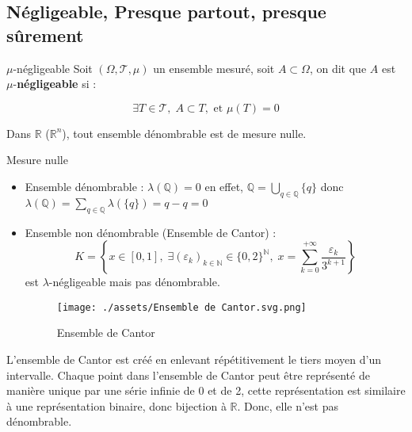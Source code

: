 \subsection{Négligeable, Presque partout, presque sûrement} %


\begin{Definition}[colbacktitle=red!75!black]{$\mu$-négligeable}{}
Soit $(\Omega, \mathcal{T}, \mu)$ un ensemble mesuré, soit $A \subset \Omega$, on dit que $A$ est $\mu$-\textbf{négligeable} si :

\begin{equation}
  \exists T \in \mathcal{T}, \; A \subset T, \text{ et } \mu(T) = 0
\end{equation}
\end{Definition}


\begin{Prop}{}{}
Dans $\mathbb{R}$ ($\mathbb{R} ^{n}$), tout ensemble dénombrable est de mesure nulle. 
\end{Prop}


\begin{Example}{Mesure nulle}{}
\begin{itemize}

    \item Ensemble dénombrable : $\lambda ( \mathbb{Q}) = 0$ en effet, $\mathbb{Q} = \bigcup _{q \in \mathbb{Q}} \{q\}$ donc $\lambda(\mathbb{Q}) = \sum_{q \in \mathbb{Q}}^{}\lambda(\{q\}) = q-q =0$
    \item Ensemble non dénombrable (Ensemble de Cantor) : 
      \begin{equation}
        K = \left\{ x \in [0,1], \; \exists (\varepsilon_k) _{k \in \mathbb{N}} \in \{0, 2 \} ^{\mathbb{N}}, \; x = \sum_{k=0}^{ + \infty} \frac{\varepsilon_k}{3 ^{k+1}} \right\}
      \end{equation}
      est $\lambda$-négligeable mais pas dénombrable.

      \begin{figure}[H] %
        \centering
        \texttt{[image: ./assets/Ensemble de Cantor.svg.png]}
        \caption{Ensemble de Cantor}
        \label{fig:Ensemble de Cantor}
      \end{figure}

      
\end{itemize}
\end{Example}

\begin{myproof}{}{}
L'ensemble de Cantor est créé en enlevant répétitivement le tiers moyen d'un intervalle. Chaque point dans l'ensemble de Cantor peut être représenté de manière unique par une série infinie de 0 et de 2, cette représentation est similaire à une représentation binaire, donc bijection à $\mathbb{R}$. Donc, elle n'est pas dénombrable.
\end{myproof}









